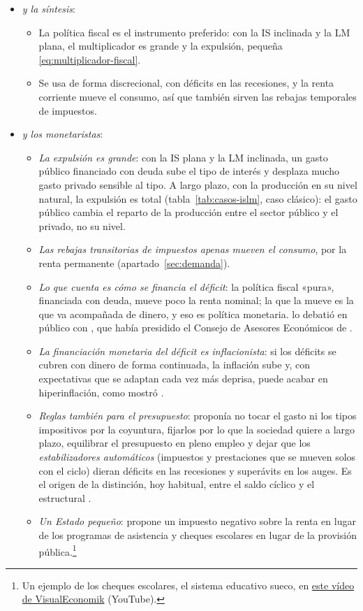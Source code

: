 \documentclass[11pt]{article}
\begin{document}
\begin{itemize}
\item \emph{ y la síntesis}:
  \begin{itemize}
  \item La política fiscal es el instrumento preferido: con la IS inclinada y la LM plana, el multiplicador es grande y la expulsión, pequeña \eqref{eq:multiplicador-fiscal}.
  \item Se usa de forma discrecional, con déficits en las recesiones, y la renta corriente mueve el consumo, así que también sirven las rebajas temporales de impuestos.
  \end{itemize}
\item \emph{ y los monetaristas}:
  \begin{itemize}
  \item \emph{La expulsión es grande}: con la IS plana y la LM inclinada, un gasto público financiado con deuda sube el tipo de interés y desplaza mucho gasto privado sensible al tipo. A largo plazo, con la producción en su nivel natural, la expulsión es total (tabla~\ref{tab:casos-islm}, caso clásico): el gasto público cambia el reparto de la producción entre el sector público y el privado, no su nivel\nocite{Friedman1970Counter}.
  \item \emph{Las rebajas transitorias de impuestos apenas mueven el consumo}, por la renta permanente (apartado~\ref{sec:demanda}).
  \item \emph{Lo que cuenta es cómo se financia el déficit}: la política fiscal «pura», financiada con deuda, mueve poco la renta nominal; la que la mueve es la que va acompañada de dinero, y eso es política monetaria.  lo debatió en público con , que había presidido el Consejo de Asesores Económicos de \nocite{FriedmanHeller1969Monetary} .
  \item \emph{La financiación monetaria del déficit es inflacionista}: si los déficits se cubren con dinero de forma continuada, la inflación sube y, con expectativas que se adaptan cada vez más deprisa, puede acabar en hiperinflación, como mostró \textcite{Cagan1956Monetary} .
  \item \emph{Reglas también para el presupuesto}: \textcite{Friedman1948Framework} proponía no tocar el gasto ni los tipos impositivos por la coyuntura, fijarlos por lo que la sociedad quiere a largo plazo, equilibrar el presupuesto en pleno empleo y dejar que los \emph{estabilizadores automáticos} (impuestos y prestaciones que se mueven solos con el ciclo) dieran déficits en las recesiones y superávits en los auges. Es el origen de la distinción, hoy habitual, entre el saldo cíclico y el estructural .
  \item \emph{Un Estado pequeño}: \textcite{Friedman1962Capitalism} propone un impuesto negativo sobre la renta en lugar de los programas de asistencia y cheques escolares en lugar de la provisión pública.\footnote{Un ejemplo de los cheques escolares, el sistema educativo sueco, en \href{https://youtu.be/DkGyH-E82uI?t=146}{este vídeo de VisualEconomik} (YouTube).}
  \end{itemize}
\end{itemize}
\end{document}
